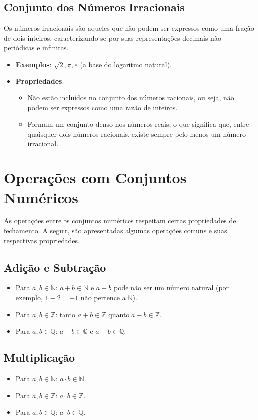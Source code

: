 \documentclass[a4paper,12pt]{article}  %
\begin{document}
\subsection{Conjunto dos Números Irracionais}
Os números irracionais são aqueles que não podem ser expressos como uma fração de dois inteiros, caracterizando-se por suas representações decimais não periódicas e infinitas.

\begin{itemize}
    \item \textbf{Exemplos}: \( \sqrt{2}, \pi, e \) (a base do logaritmo natural).
    \item \textbf{Propriedades}:
          \begin{itemize}
              \item Não estão incluídos no conjunto dos números racionais, ou seja, não podem ser expressos como uma razão de inteiros.
              \item Formam um conjunto denso nos números reais, o que significa que, entre quaisquer dois números racionais, existe sempre pelo menos um número irracional.
          \end{itemize}
\end{itemize}

\section{Operações com Conjuntos Numéricos}
As operações entre os conjuntos numéricos respeitam certas propriedades de fechamento. A seguir, são apresentadas algumas operações comuns e suas respectivas propriedades.

\subsection{Adição e Subtração}
\begin{itemize}
    \item Para \( a, b \in \mathbb{N} \): \( a + b \in \mathbb{N} \) e \( a - b \) pode não ser um número natural (por exemplo, \( 1 - 2 = -1 \) não pertence a \( \mathbb{N} \)).
    \item Para \( a, b \in \mathbb{Z} \): tanto \( a + b \in \mathbb{Z} \) quanto \( a - b \in \mathbb{Z} \).
    \item Para \( a, b \in \mathbb{Q} \): \( a + b \in \mathbb{Q} \) e \( a - b \in \mathbb{Q} \).
\end{itemize}

\subsection{Multiplicação}
\begin{itemize}
    \item Para \( a, b \in \mathbb{N} \): \( a \cdot b \in \mathbb{N} \).
    \item Para \( a, b \in \mathbb{Z} \): \( a \cdot b \in \mathbb{Z} \).
    \item Para \( a, b \in \mathbb{Q} \): \( a \cdot b \in \mathbb{Q} \).
\end{itemize}
\end{document}
